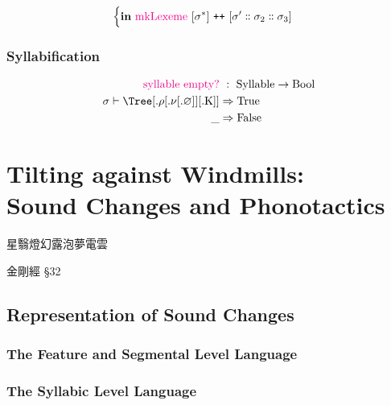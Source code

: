 \documentclass{report}[12pt]
\begin{document}
\begin{align*}
\begin{cases}
\begin{aligned}
                                                                                     & \textbf{in}\ \text{\textcolor{magenta}{mkLexeme}}\ [\sigma^{*}]\ \texttt{++}\ [\sigma' \dblcolon \sigma_2 \dblcolon \sigma_3] \\
                                                                                   \end{aligned} \\
                                                      \end{cases}
\end{align*}

\subsection{Syllabification}

\begin{align*}
  \text{\textcolor{magenta}{syllable empty?}} &\ :\ \text{Syllable} \rightarrow \text{Bool} \\
  \sigma \vdash \Tree [.\text{$\rho$} [.\text{$\nu$} [.\text{$\varnothing$} ] ] [.\text{K} ] ] & \Rightarrow \text{True} \\
  \_ & \Rightarrow \text{False} \\
\end{align*}

\chapter{Tilting against Windmills: \\ Sound Changes and Phonotactics}

\epigraph{星翳燈幻露泡夢電雲\footnotemark}{金剛經 \S32}

\section{Representation of Sound Changes}

\subsection{The Feature and Segmental Level Language}

\subsection{The Syllabic Level Language}
\end{document}
